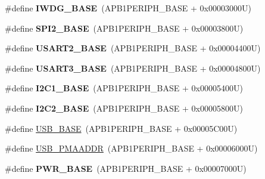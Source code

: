 \begin{DoxyCompactItemize}
\item 
\hypertarget{group___peripheral__memory__map_ga8543ee4997296af5536b007cd4748f55}{\#define {\bfseries I\-W\-D\-G\-\_\-\-B\-A\-S\-E}~(A\-P\-B1\-P\-E\-R\-I\-P\-H\-\_\-\-B\-A\-S\-E + 0x00003000\-U)}\label{group___peripheral__memory__map_ga8543ee4997296af5536b007cd4748f55}

\item 
\hypertarget{group___peripheral__memory__map_gac3e357b4c25106ed375fb1affab6bb86}{\#define {\bfseries S\-P\-I2\-\_\-\-B\-A\-S\-E}~(A\-P\-B1\-P\-E\-R\-I\-P\-H\-\_\-\-B\-A\-S\-E + 0x00003800\-U)}\label{group___peripheral__memory__map_gac3e357b4c25106ed375fb1affab6bb86}

\item 
\hypertarget{group___peripheral__memory__map_gade83162a04bca0b15b39018a8e8ec090}{\#define {\bfseries U\-S\-A\-R\-T2\-\_\-\-B\-A\-S\-E}~(A\-P\-B1\-P\-E\-R\-I\-P\-H\-\_\-\-B\-A\-S\-E + 0x00004400\-U)}\label{group___peripheral__memory__map_gade83162a04bca0b15b39018a8e8ec090}

\item 
\hypertarget{group___peripheral__memory__map_gabe0d6539ac0026d598274ee7f45b0251}{\#define {\bfseries U\-S\-A\-R\-T3\-\_\-\-B\-A\-S\-E}~(A\-P\-B1\-P\-E\-R\-I\-P\-H\-\_\-\-B\-A\-S\-E + 0x00004800\-U)}\label{group___peripheral__memory__map_gabe0d6539ac0026d598274ee7f45b0251}

\item 
\hypertarget{group___peripheral__memory__map_gacd72dbffb1738ca87c838545c4eb85a3}{\#define {\bfseries I2\-C1\-\_\-\-B\-A\-S\-E}~(A\-P\-B1\-P\-E\-R\-I\-P\-H\-\_\-\-B\-A\-S\-E + 0x00005400\-U)}\label{group___peripheral__memory__map_gacd72dbffb1738ca87c838545c4eb85a3}

\item 
\hypertarget{group___peripheral__memory__map_ga04bda70f25c795fb79f163b633ad4a5d}{\#define {\bfseries I2\-C2\-\_\-\-B\-A\-S\-E}~(A\-P\-B1\-P\-E\-R\-I\-P\-H\-\_\-\-B\-A\-S\-E + 0x00005800\-U)}\label{group___peripheral__memory__map_ga04bda70f25c795fb79f163b633ad4a5d}

\item 
\#define \hyperlink{group___peripheral__memory__map_gaa6c4cbed4ddbb3ecd77de93fab2a2e04}{U\-S\-B\-\_\-\-B\-A\-S\-E}~(A\-P\-B1\-P\-E\-R\-I\-P\-H\-\_\-\-B\-A\-S\-E + 0x00005\-C00\-U)
\item 
\#define \hyperlink{group___peripheral__memory__map_gaf992dfdd5707568c5cb5506e2347e808}{U\-S\-B\-\_\-\-P\-M\-A\-A\-D\-D\-R}~(A\-P\-B1\-P\-E\-R\-I\-P\-H\-\_\-\-B\-A\-S\-E + 0x00006000\-U)
\item 
\hypertarget{group___peripheral__memory__map_gac691ec23dace8b7a649a25acb110217a}{\#define {\bfseries P\-W\-R\-\_\-\-B\-A\-S\-E}~(A\-P\-B1\-P\-E\-R\-I\-P\-H\-\_\-\-B\-A\-S\-E + 0x00007000\-U)}\label{group___peripheral__memory__map_gac691ec23dace8b7a649a25acb110217a}


\end{DoxyCompactItemize}
